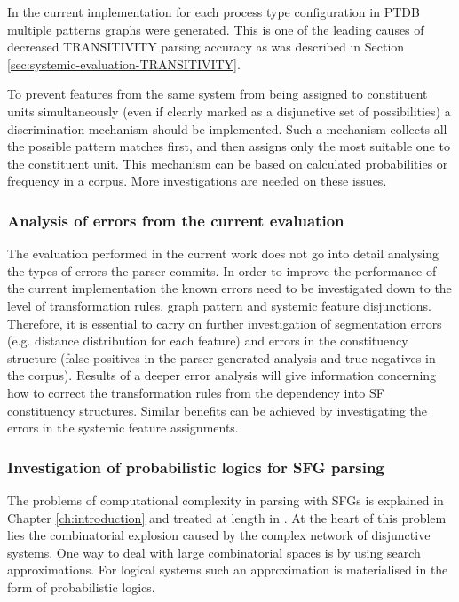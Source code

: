     In the current implementation for each process type configuration in PTDB multiple patterns graphs were generated. This is one of the leading causes of decreased TRANSITIVITY parsing accuracy as was described in Section \ref{sec:systemic-evaluation-TRANSITIVITY}.
    
    To prevent features from the same system from being assigned to constituent units simultaneously (even if clearly marked as a disjunctive set of possibilities) a discrimination mechanism should be implemented. Such a mechanism collects all the possible pattern matches first, and then assigns only the most suitable one to the constituent unit. This mechanism can be based on calculated probabilities or frequency in a corpus. More investigations are needed on these issues. 

\subsubsection{Analysis of errors from the current evaluation}     
    
    The evaluation performed in the current work does not go into detail analysing the types of errors the parser commits. In order to improve the performance of the current implementation the known errors need to be investigated down to the level of transformation rules, graph pattern and systemic feature disjunctions. Therefore, it is essential to carry on further investigation of segmentation errors (e.g. distance distribution for each feature) and errors in the constituency structure (false positives in the parser generated analysis and true negatives in the corpus). Results of a deeper error analysis will give information concerning how to correct the transformation rules from the dependency into SF constituency structures. Similar benefits can be achieved by investigating the errors in the systemic feature assignments.

\subsubsection{Investigation of probabilistic logics for SFG parsing}
    
    The problems of computational complexity in parsing with SFGs is explained in Chapter \ref{ch:introduction} and treated at length in \citet{Bateman2008}. At the heart of this problem lies the combinatorial explosion caused by the complex network of disjunctive systems. One way to deal with large combinatorial spaces is by using search approximations. For logical systems such an approximation is materialised in the form of probabilistic logics.
    
